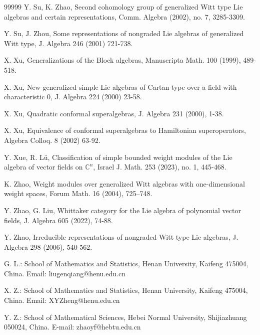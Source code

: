 \documentclass[12pt,a4paper]{amsart}
\numberwithin{equation}{section}
\begin{document}
\begin{thebibliography}{99999}
Y. Su, K. Zhao, Second cohomology group of generalized Witt type Lie algebras and certain representations, Comm. Algebra (2002), no. 7, 3285-3309.


 Y. Su, J. Zhou, Some representations of nongraded Lie algebras of generalized Witt type, J. Algebra 246 (2001) 721-738.

 X. Xu, Generalizations of the Block algebras, Manuscripta Math. 100 (1999), 489-518.


 X. Xu, New generalized simple Lie algebras of Cartan type over a field with characteristic $0$, J. Algebra 224 (2000) 23-58.

 X. Xu, Quadratic conformal superalgebras, J. Algebra 231 (2000), 1-38.

 X. Xu, Equivalence of conformal superalgebras to Hamiltonian superoperators, Algebra Colloq. 8 (2002)
63-92.


Y. Xue, R. L\"{u}, Classification of simple bounded weight modules of the Lie algebra of vector fields on $\mathbb{C}^n$, Israel J. Math. 253 (2023), no. 1, 445-468.

K. Zhao, Weight modules over generalized Witt algebras with one-dimensional weight spaces, Forum Math. 16 (2004), 725--748.


Y. Zhao, G. Liu, Whittaker category for the Lie algebra of polynomial vector fields, J. Algebra 605 (2022), 74-88.

 Y. Zhao, Irreducible representations of nongraded Witt type Lie algebras, J. Algebra 298 (2006), 540-562.

\end{thebibliography}

\vspace{4mm}


\noindent G. L.: School of Mathematics and Statistics,
Henan University, Kaifeng 475004, China. Email: liugenqiang@henu.edu.cn

\noindent  X. Z.: School of Mathematics and Statistics,
Henan University, Kaifeng 475004, China. Email: XYZheng@henu.edu.cn

\noindent  Y. Z.: School of Mathematical Sciences, Hebei Normal University, Shijiazhuang 050024, China. E-mail: zhaoyf@hebtu.edu.cn





\vspace{0.2cm}
\end{document}
